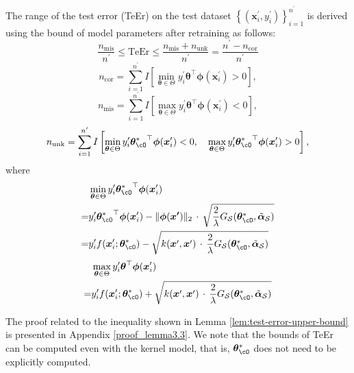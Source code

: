 \begin{lemma}
\label{lem:test-error-upper-bound}
The range of the test error (\textrm{TeEr}) on the test dataset $\left\{\left(\boldsymbol{x}_i^{\prime}, y_i^{\prime}\right)\right\}_{i=1}^{n^\prime}$ is derived using the bound of model parameters after retraining as follows:
    \begin{equation*}
\frac{n_{\text{mis}}}{n^\prime} \leq \textrm{TeEr} \leq \frac{n_{\text{mis}} + n_{\text{unk}}}{n^\prime} = \frac{n^\prime - n_{\text{cor}}}{n^\prime}
\end{equation*}
\[
n_{\text{cor}} = \sum_{i=1}^{n^\prime}  I\left[\min_{\boldsymbol{\theta}\in\Theta} y_i^\prime\boldsymbol{\theta}^\top\boldsymbol{\phi}(\boldsymbol{x}_i^\prime) > 0\right],
\]
\[
n_{\text{mis}} =  \sum_{i=1}^{n^\prime}  I\left[\max_{\boldsymbol{\theta}\in\Theta} y_i^\prime\boldsymbol{\theta}^\top\boldsymbol{\phi}(\boldsymbol{x}_i^\prime) < 0\right],
\]
\[
n_{\text{unk}} =\sum_{i=1}^{n^\prime}  I\left[\min_{\boldsymbol{\theta}\in\Theta} y_i^\prime{\bm \theta_{\cO}^*}^\top\boldsymbol{\phi}(\boldsymbol{x}_i^\prime) < 0,\quad \max_{\boldsymbol{\theta}\in\Theta} y_i^\prime{\bm \theta_{\cO}^*}^\top\boldsymbol{\phi}(\boldsymbol{x}_i^\prime) > 0\right],
\]
where
  \begin{equation*}
    \begin{aligned}
     & \min _{\boldsymbol{\theta} \in \Theta} y_i^\prime{\bm \theta_{\cO}^*}^\top\boldsymbol{\phi}(\boldsymbol{x}_i^\prime)\\ =&y_i^\prime{\bm \theta_{\cO}^*}^\top\boldsymbol{\phi}(\boldsymbol{x}_i^\prime)-  \|\boldsymbol{\phi}(\boldsymbol{x^\prime})\|_2 \,\cdot\, \sqrt{\frac{2}{\lambda}G_{\mathcal{S}}({\bm \theta_{\cO}^*},\tilde{\boldsymbol{\alpha}}_{\mathcal{S}})}\\= &y_i^\prime f(\boldsymbol{x}_i^\prime;  {\bm \theta_{\cO}^*})  -  \sqrt{k(\boldsymbol{x}^\prime,\boldsymbol{x}^\prime) \,\cdot\, \frac{2}{\lambda}G_{\mathcal{S}}({\bm \theta_{\cO}^*},\tilde{\boldsymbol{\alpha}}_{\mathcal{S}})}
    \end{aligned}
  \end{equation*}
  \begin{equation*}
    \begin{aligned}
     & \max _{\boldsymbol{\theta} \in \Theta} y_i^\prime{\boldsymbol{\theta}}^\top\boldsymbol{\phi}(\boldsymbol{x}_i^\prime)
     \\= &y_i^\prime f(\boldsymbol{x}_i^\prime;  {\bm \theta_{\cO}^*})  +  \sqrt{k(\boldsymbol{x}^\prime,\boldsymbol{x}^\prime) \,\cdot\, \frac{2}{\lambda}G_{\mathcal{S}}({\bm \theta_{\cO}^*},\tilde{\boldsymbol{\alpha}}_{\mathcal{S}})}
    \end{aligned}
  \end{equation*}

\end{lemma}
The proof related to the inequality shown in Lemma \ref{lem:test-error-upper-bound} is presented in Appendix \ref{proof_lemma3.3}.
We note that the bounds of TeEr can be computed even with the kernel model, that is, ${\bm \theta_{\cO}^*}$ does not need to be explicitly computed. 

